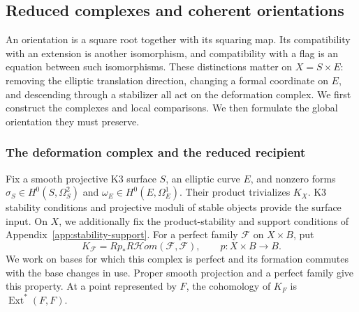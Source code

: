 \subsection{Reduced complexes and coherent orientations}
\label{subsec:cosection-twisted-orientation}

An orientation is a square root together with its squaring map.  Its
compatibility with an extension is another isomorphism, and compatibility
with a flag is an equation between such isomorphisms.  These distinctions
matter on \(X=S\times E\): removing the elliptic translation direction,
changing a formal coordinate on \(E\), and descending through a stabilizer
all act on the deformation complex.  We first construct the complexes and
local comparisons.  We then formulate the global orientation they must
preserve.

\subsubsection*{The deformation complex and the reduced recipient}

Fix a smooth projective K3 surface \(S\), an elliptic curve \(E\), and
nonzero forms \(\sigma_S\in H^0(S,\Omega_S^2)\) and
\(\omega_E\in H^0(E,\Omega_E^1)\).  Their product trivializes \(K_X\).
K3 stability conditions and projective moduli of stable objects
\cite{BridgelandK3Stability,BayerMacriProjectivity} provide the surface
input.  On \(X\), we additionally fix the product-stability and support
conditions of Appendix~\ref{app:stability-support}.
For a perfect family \(\mathcal F\) on \(X\times B\), put
\[
 K_{\mathcal F}=Rp_*R\mathcal Hom(\mathcal F,\mathcal F),
 \qquad p:X\times B\longrightarrow B.
\]
We work on bases for which this complex is perfect and its formation
commutes with the base changes in use.  Proper smooth projection and a
perfect family give this property.  At a point represented by \(F\), the
cohomology of \(K_F\) is \(\operatorname{Ext}^*(F,F)\).


